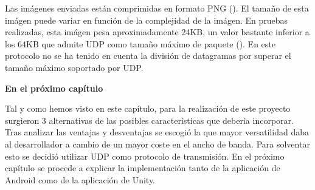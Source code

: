 Las im\'agenes enviadas est\'an comprimidas en formato PNG (\cite*{pngdefinitiveedition}). El tama\~no de esta im\'agen puede variar en funci\'on de la complejidad de la im\'agen. En pruebas realizadas, esta im\'agen pesa aproximadamente 24KB, un valor bastante inferior a los 64KB que admite UDP como tama\~no m\'aximo de paquete (\cite*{udp}). En este protocolo no se ha tenido en cuenta la divisi\'on de datagramas por superar el tama\~no m\'aximo soportado por UDP.\\

\vspace{30mm}

\bigskip
\Large{\textbf{En el pr\'oximo cap\'itulo}}\\
\normalsize

Tal y como hemos visto en este cap\'itulo, para la realizaci\'on de este proyecto surgieron 3 alternativas de las posibles caracter\'isticas que deber\'ia incorporar. Tras analizar las ventajas y desventajas se escogi\'o la que mayor versatilidad daba al desarrollador a cambio de un mayor coste en el ancho de banda. Para solventar esto se decidi\'o utilizar UDP como protocolo de transmisi\'on. En el pr\'oximo cap\'itulo se procede a explicar la implementaci\'on tanto de la aplicaci\'on de Android como de  la aplicaci\'on de Unity. 


